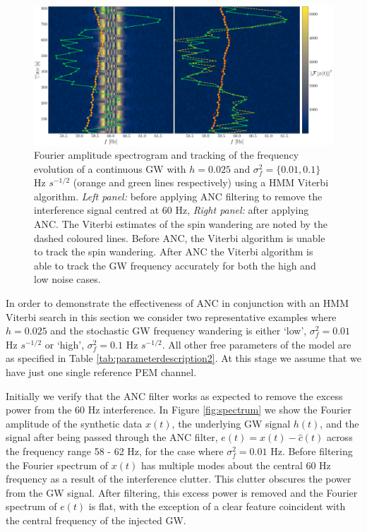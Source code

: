 \documentclass[pra,superscriptaddress,reprint,amsmath,amssymb,nofootinbib]{revtex4-2}
\begin{document}
\begin{figure}
	\begin{center}
			\includegraphics[width=\textwidth]{images/viterbi_tracking_canonical}
		\end{center}
	\caption{\label{frequency tracking before and after1}
			Fourier amplitude spectrogram and tracking of the frequency evolution of a continuous GW with $h = 0.025$ and $\sigma_f^2 = \{0.01, 0.1\}$ Hz $s^{-1/2}$ (orange and green lines respectively) using a HMM Viterbi algorithm. \textit{Left panel:}  before applying ANC filtering to remove the interference signal centred at 60 Hz, \textit{Right panel:} after applying ANC. The Viterbi estimates of the spin wandering are noted by the dashed coloured lines. Before ANC, the Viterbi algorithm is unable to track the spin wandering. After ANC the Viterbi algorithm is able to track the GW frequency accurately for both the high and low noise cases.}
\end{figure}

In order to demonstrate the effectiveness of ANC in conjunction with an HMM Viterbi search in this section we consider two representative examples where $h = 0.025$ and the stochastic GW frequency wandering is either `low', $\sigma_f^2 = 0.01$ Hz  $s^{-1/2}$ or `high', $\sigma_f^2 = 0.1$ Hz  $s^{-1/2}$. All other free parameters of the model are as specified in Table \ref{tab:parameterdescription2}. At this stage we assume that we have just one single reference PEM channel. \newline 


Initially we verify that the ANC filter works as expected to remove the excess power from the 60 Hz interference. In Figure \ref{fig:spectrum} we show the Fourier amplitude of the synthetic data $x(t)$, the underlying GW signal $h(t)$, and the signal after being passed through the ANC filter, $e(t) = x(t) - \hat{c}(t)$ across the frequency range 58 - 62 Hz, for the case where $\sigma_f^2 = 0.01$ Hz. Before filtering the Fourier spectrum of $x(t)$ has multiple modes about the central 60 Hz frequency as a result of the interference clutter. This clutter obscures the power from the GW signal. After filtering, this excess power is removed and the Fourier spectrum of $e(t)$ is flat, with the exception of a clear feature coincident with the central frequency of the injected GW.  \newline 
 
\end{document}
